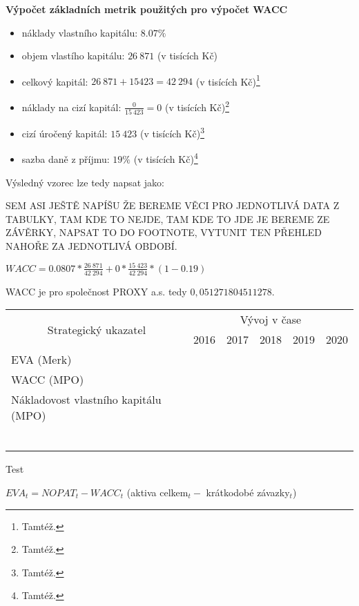 \noindent\textbf{Výpočet základních metrik použitých pro výpočet WACC}

\begin{itemize}
	\item náklady vlastního kapitálu: $8.07\%$%
	\item objem vlastího kapitálu: $26\ 871$ (v tisících Kč)
	\item celkový kapitál: $26\ 871 + 15 423 = 42\ 294$ (v tisících Kč)\footnote{Tamtéž.}
	\item náklady na cizí kapitál: $\frac{0}{15\ 423} = 0$ (v tisících Kč)\footnote{Tamtéž.}
	\item cizí úročený kapitál: $15\ 423$ (v tisících Kč)\footnote{Tamtéž.}
	\item sazba daně z příjmu: $19\%$ (v tisících Kč)\footnote{Tamtéž.}
\end{itemize}

Výsledný vzorec lze tedy napsat jako:

SEM ASI JEŠTĚ NAPÍŠU ŽE BEREME VĚCI PRO JEDNOTLIVÁ DATA Z TABULKY, TAM KDE TO NEJDE, TAM KDE TO JDE JE BEREME ZE ZÁVĚRKY, NAPSAT TO DO FOOTNOTE, VYTUNIT TEN PŘEHLED NAHOŘE ZA JEDNOTLIVÁ OBDOBÍ.

\begin{center}
$WACC = 0.0807 * \frac{26\ 871}{42\ 294} + 0 * \frac{15\ 423}{42\ 294} * (1 - 0.19)$	
\end{center}

WACC je pro společnost PROXY a.s. tedy $0,051271804511278$.


\begin{table}[!htbp]
\begin{tabular}{llllll}
\hline
\multicolumn{1}{|c|}{\multirow{2}{*}{Strategický ukazatel}} & \multicolumn{5}{c|}{Vývoj v čase} \\ \cline{2-6} 
\multicolumn{1}{|c|}{} & \multicolumn{1}{c|}{2016} & \multicolumn{1}{c|}{2017} & \multicolumn{1}{c|}{2018} & \multicolumn{1}{c|}{2019} & \multicolumn{1}{c|}{2020} \\ \hline
\multicolumn{1}{|l|}{EVA (Merk)} & \multicolumn{1}{l|}{} & \multicolumn{1}{l|}{} & \multicolumn{1}{l|}{} & \multicolumn{1}{l|}{} & \multicolumn{1}{l|}{} \\ \hline
\multicolumn{1}{|l|}{WACC (MPO)} & \multicolumn{1}{l|}{} & \multicolumn{1}{l|}{} & \multicolumn{1}{l|}{} & \multicolumn{1}{l|}{} & \multicolumn{1}{l|}{} \\ \hline
\multicolumn{1}{|l|}{Nákladovost vlastního kapitálu (MPO)} & \multicolumn{1}{l|}{} & \multicolumn{1}{l|}{} & \multicolumn{1}{l|}{} & \multicolumn{1}{l|}{} & \multicolumn{1}{l|}{} \\ \hline
 &  &  &  &  &  \\
 &  &  &  &  &  \\
 &  &  &  &  &  \\
 &  &  &  &  &  \\
 &  &  &  &  &  \\
 &  &  &  &  & 
\end{tabular}
\end{table}

Test 

$EVA_t = NOPAT_t - WACC_t$ (aktiva celkem$_t -$ krátkodobé závazky$_t$)

